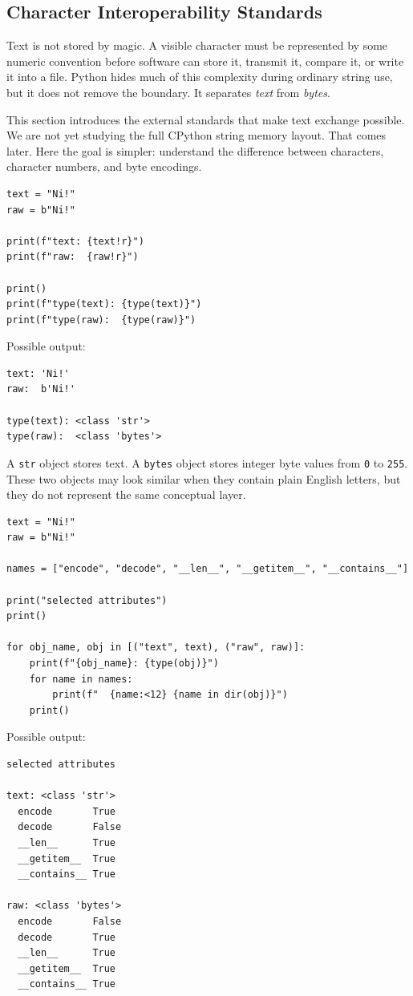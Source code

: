 \subsection{Character Interoperability Standards}

Text is not stored by magic. A visible character must be represented by some numeric convention before software can store it, transmit it, compare it, or write it into a file. Python hides much of this complexity during ordinary string use, but it does not remove the boundary. It separates \emph{text} from \emph{bytes}.

This section introduces the external standards that make text exchange possible. We are not yet studying the full CPython string memory layout. That comes later. Here the goal is simpler: understand the difference between characters, character numbers, and byte encodings.

\begin{verbatim}
text = "Ni!"
raw = b"Ni!"

print(f"text: {text!r}")
print(f"raw:  {raw!r}")

print()
print(f"type(text): {type(text)}")
print(f"type(raw):  {type(raw)}")
\end{verbatim}

Possible output:

\begin{verbatim}
text: 'Ni!'
raw:  b'Ni!'

type(text): <class 'str'>
type(raw):  <class 'bytes'>
\end{verbatim}

A \texttt{str} object stores text. A \texttt{bytes} object stores integer byte values from \texttt{0} to \texttt{255}. These two objects may look similar when they contain plain English letters, but they do not represent the same conceptual layer.

\begin{verbatim}
text = "Ni!"
raw = b"Ni!"

names = ["encode", "decode", "__len__", "__getitem__", "__contains__"]

print("selected attributes")
print()

for obj_name, obj in [("text", text), ("raw", raw)]:
    print(f"{obj_name}: {type(obj)}")
    for name in names:
        print(f"  {name:<12} {name in dir(obj)}")
    print()
\end{verbatim}

Possible output:

\begin{verbatim}
selected attributes

text: <class 'str'>
  encode       True
  decode       False
  __len__      True
  __getitem__  True
  __contains__ True

raw: <class 'bytes'>
  encode       False
  decode       True
  __len__      True
  __getitem__  True
  __contains__ True
\end{verbatim}

